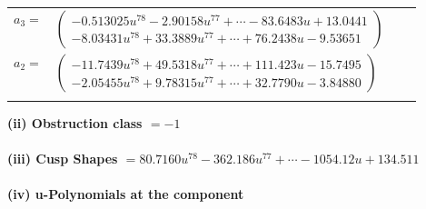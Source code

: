 \documentclass[1p]{elsarticle_modified}
\theoremstyle{definition}
\begin{document}
\begin{tabular}{m{7pt} m{180pt} m{7pt} m{180pt} }
\flushright $a_{3}=$&$\begin{pmatrix}-0.513025 u^{78}-2.90158 u^{77}+\cdots-83.6483 u+13.0441\\-8.03431 u^{78}+33.3889 u^{77}+\cdots+76.2438 u-9.53651\end{pmatrix}$ \\
\flushright $a_{2}=$&$\begin{pmatrix}-11.7439 u^{78}+49.5318 u^{77}+\cdots+111.423 u-15.7495\\-2.05455 u^{78}+9.78315 u^{77}+\cdots+32.7790 u-3.84880\end{pmatrix}$\\&\end{tabular}
\flushleft \textbf{(ii) Obstruction class $= -1$}\\~\\
\flushleft \textbf{(iii) Cusp Shapes $= 80.7160 u^{78}-362.186 u^{77}+\cdots-1054.12 u+134.511$}\\~\\
\newpage\renewcommand{\arraystretch}{1}
\flushleft \textbf{(iv) u-Polynomials at the component}\newline \\
\end{document}
